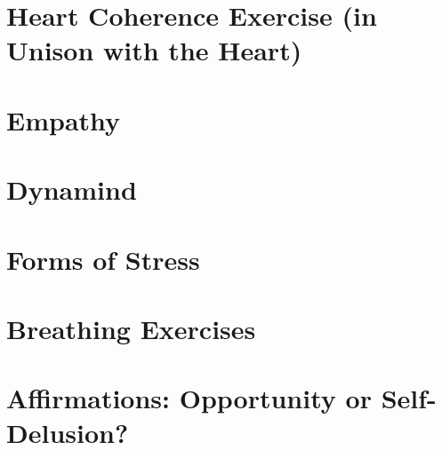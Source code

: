 \documentclass[../main.tex]{subfiles}
\begin{document}
\chapter[Heart Coherence Exercise]{Heart Coherence Exercise (in Unison with the Heart)}


\chapter{Empathy}


\chapter{Dynamind}


\chapter{Forms of Stress}


\chapter{Breathing Exercises}


\chapter{Affirmations: Opportunity or Self-Delusion?}

\end{document}
